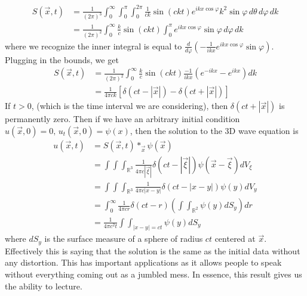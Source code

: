 \documentclass{article}
\newcommand{\R}{\mathbb{R}}
\newcommand{\od}[2]{\frac{d #1}{d #2}}
\newcommand{\pull}{\!\!\!}
\theoremstyle{definition}
\begin{document}
\begin{align*}
    S(\vec x,t) &= \frac{1}{(2\pi)^3} \int_0^\infty \int_0^\pi \int_0^{2\pi} \frac{1}{ck} \sin(ckt) e^{i k x \cos\varphi} k^2 \sin\varphi \, d\theta \, d\varphi \, dk \\
    &=\frac{1}{(2\pi)^2}\int^\infty_0 \frac{k}{c} \sin (ckt) \int^\pi_0 e^{i k x \cos\varphi} \sin\varphi \, d\varphi \, dk
\end{align*}
where we recognize the inner integral is equal to $\od{}{\varphi} \left( -\frac{1}{ikx}e^{i k x \cos\varphi} \sin\varphi \right)$. Plugging in the bounds, we get 
\begin{align*}
    S(\vec x,t) &=\frac{1}{(2\pi)^2} \int^\infty_0 \frac{k}{c} \sin (ckt) \frac{-1}{ikx} ( e^{-ikx}-e^{ikx}) dk\\
    &= \frac{1}{4\pi ck} [\delta (ct-|\vec x|)-\delta (ct+|\vec x|)]
\end{align*}
If $t>0$, (which is the time interval we are considering), then $\delta (ct+|\vec x|)$ is permanently zero. Then if we have an arbitrary initial condition $u(\vec x,0) =0,\, u_t(\vec x,0) = \psi (x)$, then the solution to the 3D wave equation is 
\begin{align*}
    u(\vec x,t) &= S(\vec x, t) *_{\vec x} \psi (\vec x)\\
    &=\int \pull \int \pull \int_{\R^3} \frac{1}{4\pi c |\vec \xi|}\delta (ct-|\vec \xi|) \psi(\vec x - \vec \xi) dV_{\xi} \\
    &= \int \pull \int \pull \int_{\R^3} \frac{1}{4\pi c | x -  y|}\delta (ct-|x -  y|) \psi( y) dV_{ y} \\
    &= \int^\infty_0 \frac{1}{4\pi cr} \delta(ct-r) \left( \int \pull \int_{\R^2} \psi(y) dS_y\right) dr\\
    &= \frac{1}{4\pi c^2t} \int \pull \int_{| x-y|=ct} \psi(y) dS_y
\end{align*}
where $dS_y$ is the surface measure of a sphere of radius $ct$ centered at $\vec x$. Effectively this is saying that the solution is the same as the initial data without any distortion. This has important applications as it allows people to speak without everything coming out as a jumbled mess. In essence, this result gives us the ability to lecture.
\end{document}
